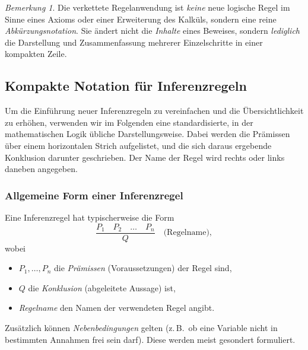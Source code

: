 \documentclass{book}
\theoremstyle{plain}
\theoremstyle{remark}
\newtheorem*{remark}{Bemerkung}
\theoremstyle{definition}
\begin{document}
\begin{remark}
Die verkettete Regelanwendung ist \emph{keine} neue logische Regel im Sinne eines Axioms oder einer Erweiterung des Kalküls, sondern eine reine \emph{Abkürzungsnotation}. Sie ändert nicht die \emph{Inhalte} eines Beweises, sondern \emph{lediglich} die Darstellung und Zusammenfassung mehrerer Einzelschritte in einer kompakten Zeile.
\end{remark}





\subsection{Kompakte Notation für Inferenzregeln}

Um die Einführung neuer Inferenzregeln zu vereinfachen und die Übersichtlichkeit zu erhöhen, verwenden wir im Folgenden eine standardisierte, in der mathematischen Logik übliche Darstellungsweise. Dabei werden die Prämissen über einem horizontalen Strich aufgelistet, und die sich daraus ergebende Konklusion darunter geschrieben. Der Name der Regel wird rechts oder links daneben angegeben. 

\subsubsection{Allgemeine Form einer Inferenzregel}
Eine Inferenzregel hat typischerweise die Form
\[
\frac{P_1 \quad P_2 \quad \dots \quad P_n}{Q}
\quad
\text{(Regelname)},
\]
wobei
\begin{itemize}
    \item $P_1, \dots, P_n$ die \emph{Prämissen} (Voraussetzungen) der Regel sind,
    \item $Q$ die \emph{Konklusion} (abgeleitete Aussage) ist,
    \item \textit{Regelname} den Namen der verwendeten Regel angibt.
\end{itemize}
Zusätzlich können \emph{Nebenbedingungen} gelten (z.\,B.\ ob eine Variable nicht in bestimmten Annahmen frei sein darf). Diese werden meist gesondert formuliert.
\end{document}
